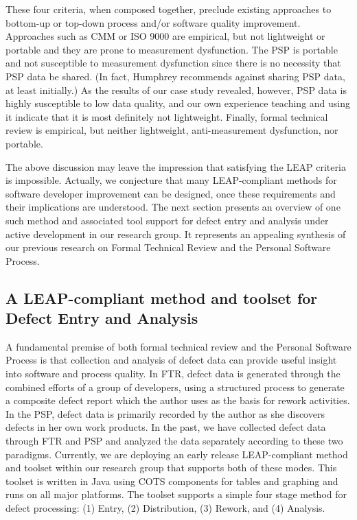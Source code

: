 These four criteria, when composed together, preclude existing
approaches to bottom-up or top-down process and/or software quality
improvement. Approaches such as CMM or ISO 9000 are empirical, but not
lightweight or portable and they are prone to measurement dysfunction. The
PSP is portable and not susceptible to measurement dysfunction since there
is no necessity that PSP data be shared. (In fact, Humphrey recommends
against sharing PSP data, at least initially.)  As the results of our case
study revealed, however, PSP data is highly susceptible to low data
quality, and our own experience teaching and using it indicate that it is
most definitely not lightweight.  Finally, formal technical review is
empirical, but neither lightweight, anti-measurement dysfunction, nor
portable.

The above discussion may leave the impression that satisfying the LEAP
criteria is impossible. Actually, we conjecture that many LEAP-compliant
methods for software developer improvement can be designed, once these
requirements and their implications are understood. The next section
presents an overview of one such method and associated tool support for
defect entry and analysis under active development in our research group.
It represents an appealing synthesis of our previous research on Formal
Technical Review and the Personal Software Process.

\subsection*{A LEAP-compliant method and toolset for Defect Entry and Analysis}

A fundamental premise of both formal technical review and the Personal
Software Process is that collection and analysis of defect data can provide
useful insight into software and process quality.  In FTR, defect data is
generated through the combined efforts of a group of developers, using a
structured process to generate a composite defect report which the author
uses as the basis for rework activities.  In the PSP, defect data is
primarily recorded by the author as she discovers defects in her own work
products. In the past, we have collected defect data through FTR and PSP
and analyzed the data separately according to these two paradigms.
Currently, we are deploying an early release LEAP-compliant method and toolset
within our research group that supports both of these modes. This toolset
is written in Java using COTS components for tables and graphing and runs
on all major platforms.  The toolset supports a simple four stage method
for defect processing: (1) Entry, (2) Distribution, (3) Rework, and (4) Analysis.


